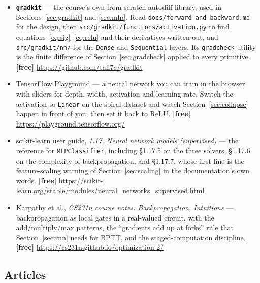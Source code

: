 \documentclass[11pt]{article}
\begin{document}
\begin{itemize}[leftmargin=*]
  \item \textbf{\texttt{gradkit}} --- the course's own from-scratch autodiff
    library, used in Sections~\ref{sec:gradkit} and \ref{sec:mlp}. Read
    \texttt{docs/forward-and-backward.md} for the design, then
    \texttt{src/gradkit/functions/activation.py} to find
    equations~\eqref{eq:sig}--\eqref{eq:relu} and their derivatives written
    out, and \texttt{src/gradkit/nn/} for the \texttt{Dense} and
    \texttt{Sequential} layers. Its \texttt{gradcheck} utility is the finite
    difference of Section~\ref{sec:gradcheck} applied to every primitive.
    \textbf{[free]} \url{https://github.com/tali7c/gradkit}
  \item TensorFlow Playground --- a neural network you can train in the
    browser with sliders for depth, width, activation and learning rate.
    Switch the activation to \texttt{Linear} on the spiral dataset and watch
    Section~\ref{sec:collapse} happen in front of you; then set it back to
    ReLU. \textbf{[free]} \url{https://playground.tensorflow.org/}
  \item scikit-learn user guide, \emph{1.17. Neural network models
    (supervised)} --- the reference for \texttt{MLPClassifier}, including
    \S1.17.5 on the three solvers, \S1.17.6 on the complexity of
    backpropagation, and \S1.17.7, whose first line is the feature-scaling
    warning of Section~\ref{sec:scaling} in the documentation's own words.
    \textbf{[free]}
    \url{https://scikit-learn.org/stable/modules/neural_networks_supervised.html}
  \item Karpathy et al., \emph{CS231n course notes: Backpropagation,
    Intuitions} --- backpropagation as local gates in a real-valued circuit,
    with the add/multiply/max patterns, the ``gradients add up at forks'' rule
    that Section~\ref{sec:rnn} needs for BPTT, and the staged-computation
    discipline. \textbf{[free]} \url{https://cs231n.github.io/optimization-2/}
\end{itemize}

\subsection*{Articles}
\end{document}

